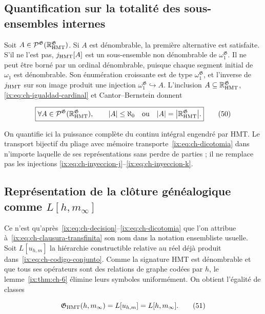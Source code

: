 \subsection{Quantification sur la totalité des sous-ensembles internes}

Soit
\(A\in\mathcal P^{\mathfrak G}
(\mathbb R_{\rm HMT}^{\mathfrak G})\). Si \(A\) est dénombrable, la
première alternative est satisfaite. S’il ne l’est pas, \(j_{\rm HMT}[A]\) est un sous-ensemble non
dénombrable de \(\omega_1^{\mathfrak G}\). Il ne peut être borné par un ordinal
dénombrable, puisque chaque segment initial de \(\omega_1\) est dénombrable. Son
énumération croissante est de type \(\omega_1^{\mathfrak G}\), et l’inverse de
\(j_{\rm HMT}\) sur son image produit une injection
\(\omega_1^{\mathfrak G}\hookrightarrow A\). L’inclusion
\(A\subseteq\mathbb R_{\rm HMT}^{\mathfrak G}\), \eqref{ix:eq:ch-igualdad-cardinal} et
Cantor--Bernstein donnent

\[
 \boxed{
 \forall A\in\mathcal P^{\mathfrak G}
   (\mathbb R_{\rm HMT}^{\mathfrak G}),\qquad
 |A|\le\aleph_0
 \quad\text{ou}\quad
 |A|=\bigl|\mathbb R_{\rm HMT}^{\mathfrak G}\bigr|.}
\tag{50}\label{ix:eq:ch-dicotomia}
\]

On quantifie ici la puissance complète du continu intégral engendré par
HMT. Le transport bijectif du pliage avec mémoire transporte~\eqref{ix:eq:ch-dicotomia} dans n’importe laquelle
de ses représentations sans perdre de parties ; il ne remplace pas les injections
\eqref{ix:eq:ch-inyeccion-j}--\eqref{ix:eq:ch-inyeccion-k}.

\subsection{Représentation de la clôture généalogique comme \texorpdfstring{\(L[h,m_\infty]\)}{L[h,m-infinito]}}

Ce n'est qu'après~\eqref{ix:eq:ch-decision}--\eqref{ix:eq:ch-dicotomia} que l'on attribue à~\eqref{ix:eq:ch-clausura-transfinita} son nom dans la notation ensembliste usuelle. Soit \(L[u_{h,m}]\) la hiérarchie constructible relative au réel déjà produit dans~\eqref{ix:eq:ch-codigo-conjunto}. Comme la signature HMT est dénombrable et que tous ses opérateurs sont des relations de graphe codées par \(h\), le lemme~\ref{ix:thm:ch-6} élimine leurs symboles uniformément. On obtient l'égalité de classes

\[
 \mathfrak G_{\rm HMT}(h,m_\infty)
 =L[u_{h,m}]=L[h,m_\infty].
\tag{51}\label{ix:eq:ch-representacion-L}
\]

